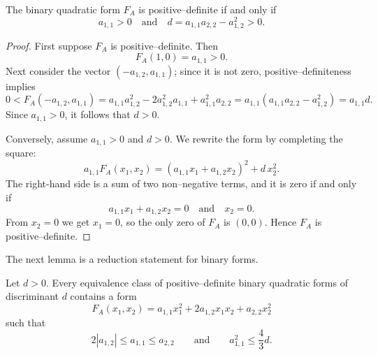 \begin{lemma}
\label{lem:binary_posdef}
The binary quadratic form $F_A$ is positive–definite if and only if
\[
  a_{1,1} > 0
  \quad\text{and}\quad
  d = a_{1,1}a_{2,2}-a_{1,2}^2 > 0.
\]
\end{lemma}

\begin{proof}
\leanok
First suppose $F_A$ is positive–definite.
Then
\[
  F_A(1,0) = a_{1,1} > 0.
\]
Next consider the vector $(-a_{1,2},a_{1,1})$; since it is not zero,
positive–definiteness implies
\[
  0 < F_A(-a_{1,2},a_{1,1})
  = a_{1,1}a_{1,2}^2 - 2a_{1,2}^2 a_{1,1} + a_{1,1}^2 a_{2,2}
  = a_{1,1}(a_{1,1}a_{2,2}-a_{1,2}^2)
  = a_{1,1}d.
\]
Since $a_{1,1}>0$, it follows that $d>0$.

Conversely, assume $a_{1,1}>0$ and $d>0$.
We rewrite the form by completing the square:
\[
  a_{1,1} F_A(x_1,x_2)
  = (a_{1,1}x_1 + a_{1,2}x_2)^2 + d\,x_2^2.
\]
The right-hand side is a sum of two non–negative terms, and it is zero
if and only if
\[
  a_{1,1}x_1 + a_{1,2}x_2 = 0
  \quad\text{and}\quad
  x_2 = 0.
\]
From $x_2=0$ we get $x_1=0$, so the only zero of $F_A$ is $(0,0)$.
Hence $F_A$ is positive–definite.
\end{proof}

The next lemma is a reduction statement for binary forms.

\begin{lemma}
\label{lem:binary-reduction}
\leanok
Let $d>0$.
Every equivalence class of positive–definite binary quadratic forms of
discriminant $d$ contains a form
\[
  F_A(x_1,x_2)
  = a_{1,1}x_1^2 + 2a_{1,2}x_1x_2 + a_{2,2}x_2^2
\]
such that
\[
  2|a_{1,2}| \le a_{1,1} \le a_{2,2}
  \qquad\text{and}\qquad
  a_{1,1}^2 \le \frac{4}{3}d.
\]
\end{lemma}


